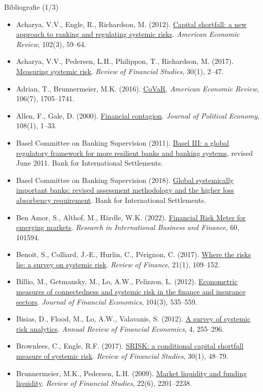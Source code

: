 \begin{frame}{Bibliografie (1/3)}
\itemsize{\tiny}
\begin{itemize}
    \item Acharya, V.V., Engle, R., Richardson, M. (2012). \href{https://doi.org/10.1257/aer.102.3.59}{Capital shortfall: a new approach to ranking and regulating systemic risks}. \textit{American Economic Review}, 102(3), 59--64.
    \item Acharya, V.V., Pedersen, L.H., Philippon, T., Richardson, M. (2017). \href{https://doi.org/10.1093/rfs/hhw088}{Measuring systemic risk}. \textit{Review of Financial Studies}, 30(1), 2--47.
    \item Adrian, T., Brunnermeier, M.K. (2016). \href{https://doi.org/10.1257/aer.20120555}{CoVaR}. \textit{American Economic Review}, 106(7), 1705--1741.
    \item Allen, F., Gale, D. (2000). \href{https://doi.org/10.1086/262109}{Financial contagion}. \textit{Journal of Political Economy}, 108(1), 1--33.
    \item Basel Committee on Banking Supervision (2011). \href{https://www.bis.org/publ/bcbs189.htm}{Basel III: a global regulatory framework for more resilient banks and banking systems}, revised June 2011. Bank for International Settlements.
    \item Basel Committee on Banking Supervision (2018). \href{https://www.bis.org/bcbs/publ/d445.htm}{Global systemically important banks: revised assessment methodology and the higher loss absorbency requirement}. Bank for International Settlements.
    \item Ben Amor, S., Althof, M., Härdle, W.K. (2022). \href{https://doi.org/10.1016/j.ribaf.2021.101594}{Financial Risk Meter for emerging markets}. \textit{Research in International Business and Finance}, 60, 101594.
    \item Benoit, S., Colliard, J.-E., Hurlin, C., Pérignon, C. (2017). \href{https://doi.org/10.1093/rof/rfw026}{Where the risks lie: a survey on systemic risk}. \textit{Review of Finance}, 21(1), 109--152.
    \item Billio, M., Getmansky, M., Lo, A.W., Pelizzon, L. (2012). \href{https://doi.org/10.1016/j.jfineco.2011.12.010}{Econometric measures of connectedness and systemic risk in the finance and insurance sectors}. \textit{Journal of Financial Economics}, 104(3), 535--559.
    \item Bisias, D., Flood, M., Lo, A.W., Valavanis, S. (2012). \href{https://doi.org/10.1146/annurev-financial-110311-101754}{A survey of systemic risk analytics}. \textit{Annual Review of Financial Economics}, 4, 255--296.
    \item Brownlees, C., Engle, R.F. (2017). \href{https://doi.org/10.1093/rfs/hhw060}{SRISK: a conditional capital shortfall measure of systemic risk}. \textit{Review of Financial Studies}, 30(1), 48--79.
    \item Brunnermeier, M.K., Pedersen, L.H. (2009). \href{https://doi.org/10.1093/rfs/hhn098}{Market liquidity and funding liquidity}. \textit{Review of Financial Studies}, 22(6), 2201--2238.
\end{itemize}
\end{frame}

